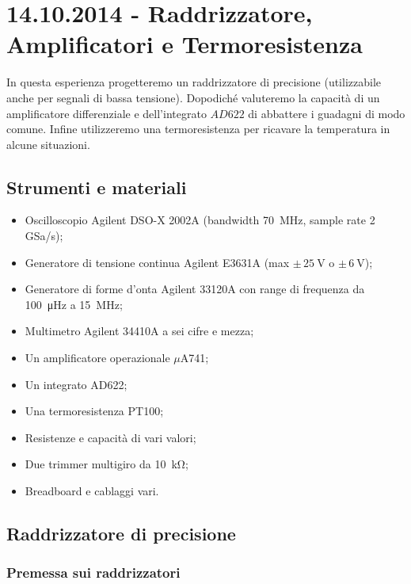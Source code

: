\section{14.10.2014 - Raddrizzatore, Amplificatori e Termoresistenza}

In questa esperienza progetteremo un raddrizzatore di precisione (utilizzabile anche per segnali di bassa tensione). Dopodiché valuteremo la capacità di un amplificatore differenziale e dell'integrato $AD622$ di abbattere i guadagni di modo comune. Infine utilizzeremo una termoresistenza per ricavare la temperatura in alcune situazioni.

\subsection*{Strumenti e materiali}

\begin{itemize} [noitemsep]
\item Oscilloscopio Agilent DSO-X 2002A (bandwidth \SI{70}{\mega\hertz}, sample rate \num{2} GSa/s);
\item Generatore di tensione continua Agilent E3631A (max $\pm \, \SI{25}{\volt}$ o $\pm \, \SI{6}{\volt}$);
\item Generatore di forme d'onta Agilent 33120A con range di frequenza da \SI{100}{\micro\hertz} a \SI{15}{\mega\hertz};
\item Multimetro Agilent 34410A a sei cifre e mezza;
\item Un amplificatore operazionale $\mu$A741;
\item Un integrato AD622;
\item Una termoresistenza PT100;
\item Resistenze e capacità di vari valori;
\item Due trimmer multigiro da \SI{10}{\kilo\ohm};
\item Breadboard e cablaggi vari.
\end{itemize}

\subsection{Raddrizzatore di precisione}

\subsubsection*{Premessa sui raddrizzatori}


